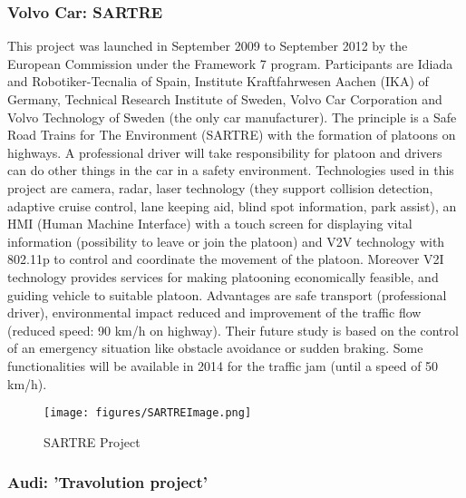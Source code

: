 \documentclass[a4paper]{article}
\begin{document}
\subsubsection{Volvo Car: SARTRE}

This project \cite{SARTRE} was launched in September 2009 to September 2012 by the European Commission under the Framework 7 program. Participants are Idiada and Robotiker-Tecnalia of Spain, Institute Kraftfahrwesen Aachen (IKA) of Germany, Technical Research Institute of Sweden, Volvo Car Corporation and Volvo Technology of Sweden (the only car manufacturer). The principle is a Safe Road Trains for The Environment (SARTRE) with the formation of platoons on highways. A professional driver will take responsibility for platoon and drivers can do other things in the car in a safety environment. Technologies used in this project are camera, radar, laser technology (they support collision detection, adaptive cruise control, lane keeping aid, blind spot information, park assist), an HMI (Human Machine Interface) with a touch screen for displaying vital information (possibility to leave or join the platoon) and V2V technology with 802.11p to control and coordinate the movement of the platoon. Moreover V2I technology provides services for making platooning economically feasible, and guiding vehicle to suitable platoon. Advantages are safe transport (professional driver), environmental impact reduced and improvement of the traffic flow (reduced speed: 90 km/h on highway). Their future study is based on the control of an emergency situation like obstacle avoidance or sudden braking. Some functionalities will be available in 2014 for the traffic jam (until a speed of 50 km/h).
\begin{figure}[!htb]
\begin{center}
\texttt{[image: figures/SARTREImage.png]}
\caption{SARTRE Project}
\end{center}
\end{figure}

\subsubsection{Audi: 'Travolution project'}
\end{document}
